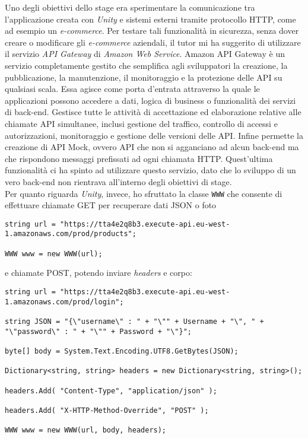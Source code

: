 Uno degli obiettivi dello stage era sperimentare la comunicazione tra l'applicazione creata con \textit{Unity} e sistemi esterni tramite protocollo HTTP, come ad esempio un \textit{e-commerce}. Per testare tali funzionalità in sicurezza, senza dover creare o modificare gli \textit{e-commerce} aziendali, il tutor mi ha suggerito di utilizzare il servizio \textit{API Gateway} di \textit{Amazon Web Service}. Amazon API Gateway è un servizio completamente gestito che semplifica agli sviluppatori la creazione, la pubblicazione, la manutenzione, il monitoraggio e la protezione delle API su qualsiasi scala. Essa agisce come porta d'entrata attraverso la quale le applicazioni possono accedere a dati, logica di business o funzionalità dei servizi di back-end. Gestisce tutte le attività di accettazione ed elaborazione relative alle chiamate API simultanee, inclusi gestione del traffico, controllo di accessi e autorizzazioni, monitoraggio e gestione delle versioni delle API. Infine permette la creazione di API Mock, ovvero API che non si agganciano ad alcun back-end ma che rispondono messaggi prefissati ad ogni chiamata HTTP. Quest'ultima funzionalità ci ha spinto ad utilizzare questo servizio, dato che lo sviluppo di un vero back-end non rientrava all'interno degli obiettivi di stage. \\
Per quanto riguarda \textit{Unity}, invece, ho sfruttato la classe \texttt{WWW} che consente di effettuare chiamate GET per recuperare dati JSON o foto

\begin{lstlisting}[firstnumber=1]
string url = "https://tta4e2q8b3.execute-api.eu-west-1.amazonaws.com/prod/products";

WWW www = new WWW(url);
\end{lstlisting}

e chiamate POST, potendo inviare \textit{headers} e corpo:

\begin{lstlisting}[firstnumber=1]
string url = "https://tta4e2q8b3.execute-api.eu-west-1.amazonaws.com/prod/login";

string JSON = "{\"username\" : " + "\"" + Username + "\", " + "\"password\" : " + "\"" + Password + "\"}";
	
byte[] body = System.Text.Encoding.UTF8.GetBytes(JSON);    
	
Dictionary<string, string> headers = new Dictionary<string, string>();
	
headers.Add( "Content-Type", "application/json" );
	
headers.Add( "X-HTTP-Method-Override", "POST" );
	
WWW www = new WWW(url, body, headers);
\end{lstlisting}

